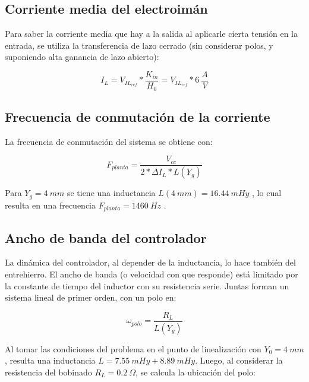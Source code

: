 \subsection{Corriente media del electroimán}

\noindent Para saber la corriente media que hay a la salida al aplicarle cierta tensión en la entrada, se utiliza la transferencia de lazo cerrado (sin considerar polos, y suponiendo alta ganancia de lazo abierto):

\begin{equation} 
I_L = V_{IL_{ref}} * \frac{K_{in}}{H_0} = V_{IL_{ref}} * 6\:\frac{A}{V}
\end{equation}

\subsection{Frecuencia de conmutación de la corriente}

\noindent La frecuencia de conmutación del sistema se obtiene con:

\begin{equation}\label{eq_frec-sw} 
F_{planta} = \frac{V_{cc}}{2*\Delta I_L * L(Y_g)}
\end{equation}

\noindent Para $Y_g = 4 \:mm $ se tiene una inductancia $L(4\:mm) = 16.44 \:mHy$ , lo cual resulta en una frecuencia $F_{planta}= 1460\:Hz$ .

\subsection{Ancho de banda del controlador}\label{esccion_AB_Controlador} 

\noindent La dinámica del controlador, al depender de la inductancia, lo hace también del entrehierro. El ancho de banda (o velocidad con que responde) está limitado por la constante de tiempo del inductor con su resistencia serie. Juntas forman un sistema lineal de primer orden, con un polo en: 

\begin{equation} \label{eq_frec-angular}
\omega _{polo} = \frac{R_L}{L(Y_g)}
\end{equation}

\noindent Al tomar las condiciones del problema en el punto de linealización con $Y_{0}=4\:mm$, resulta una inductancia $L = 7.55 \:mHy + 8.89 \:mHy$. Luego, al considerar la resistencia del bobinado $R_L=0.2\:\Omega$, se calcula la ubicación del polo:

